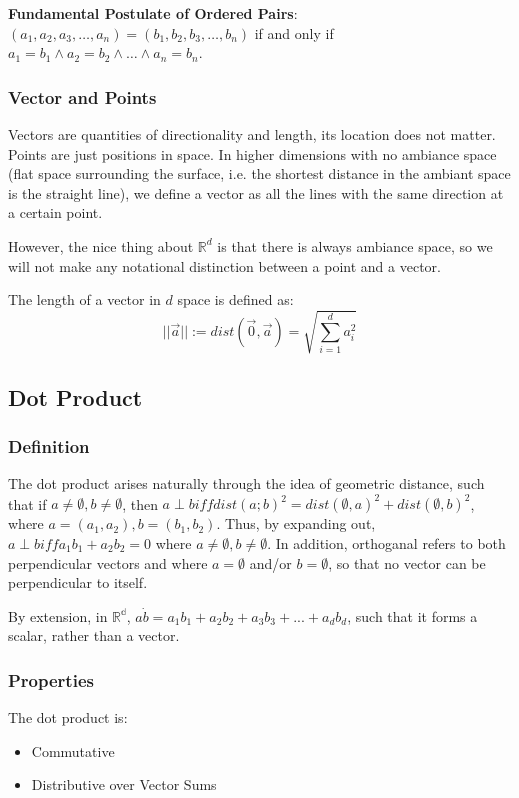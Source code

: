 \documentclass[11 pt, twoside]{article}
\begin{document}
\textbf{Fundamental Postulate of Ordered Pairs}:
$(a_1, a_2, a_3, \dots, a_n) = (b_1, b_2, b_3, \dots, b_n)$ if and only if $a_1
= b_1 \wedge a_2 = b_2 \wedge \dots \wedge a_n = b_n$.

\subsubsection{Vector and Points}
Vectors are quantities of directionality and length, its location does not
matter. Points are just positions in space. In higher dimensions with no
ambiance space (flat space surrounding the surface, i.e. the shortest distance
in the ambiant space is the straight line),  we define a vector as all
the lines with the same direction at a certain point.

However, the nice thing about $\mathbb{R}^d$ is that there is always ambiance
space, so we will not make any notational distinction between a point and a
vector.

The length of a vector in $d$ space is defined as:
$$||\vec{a}|| := dist(\vec{0}, \vec{a}) = \sqrt{\sum_{i =
1}^d a_i^2}$$

\subsection{Dot Product}
\subsubsection{Definition}
The dot product arises naturally through the idea of geometric distance, such that if $a \neq \emptyset, b \neq \emptyset$, then $a \perp b iff dist(a; b)^2 = dist(\emptyset, a)^2 + dist(\emptyset, b)^2$, where $a = (a_1, a_2), b = (b_1, b_2)$. Thus, by expanding out, $a \perp b iff a_1b_1 + a_2b_2 = 0$ where $a \neq \emptyset, b \neq \emptyset$. In addition, orthoganal refers to both perpendicular vectors and where $a = \emptyset$ and/or $b = \emptyset$, so that no vector can be perpendicular to itself.

By extension, in $\mathbb{R^d}$, $a \dot b = a_1b_1 + a_2b_2 + a_3b_3 +...+ a_db_d$, such that it forms a scalar, rather than a vector.

\subsubsection{Properties}
The dot product is:
\begin{itemize}
\item Commutative
\item Distributive over Vector Sums
\end{itemize}
\end{document}
